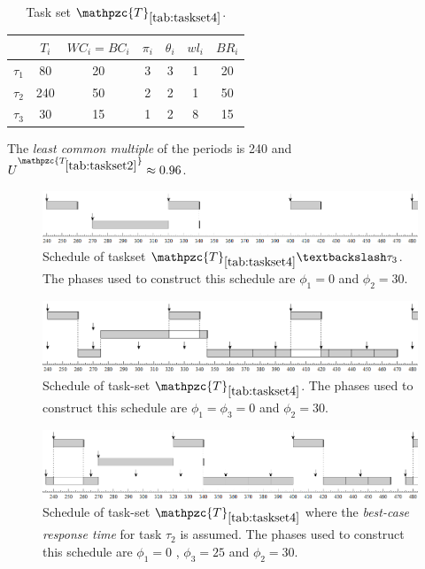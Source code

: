 \documentclass[fleqn]{article}
\begin{document}
\begin{table}[H]
	\center
	\caption{Task set $\mathpzc{T}_{\ref{tab:taskset4}}$.}
	\label{tab:taskset4}
	\begin{tabular}{c c c c c | c c}
		\hline 
		& $T_i$ & $WC_i=BC_i$ & $\pi_i$ & $\theta_i$ &  $wl_i$ & $BR_i$\\ 
		\hline 
		$\tau_1$& 80  & 20  & 3 & 3 &  1 & 20\\
		$\tau_2$& 240 & 50  & 2 & 2 &  1 & 50\\ 
		$\tau_3$& 30  & 15  & 1 & 2 &  8 & 15\\ 
		\hline 
	\end{tabular}
	\small
	\item The \textit{least common multiple} of the periods is 240 and $U^{\mathpzc{T_{\ref{tab:taskset2}}}} \approx 0.96$.
\end{table} 

\begin{figure}[H]
	\centering
	\includegraphics[width=0.9\linewidth]{figures/fact6_1}
	\caption{Schedule of taskset $\mathpzc{T}_{\ref{tab:taskset4}} \textbackslash \tau_3$. The phases used to construct this schedule are $\phi_1 = 0$ and $\phi_2 = 30$.}
	\label{fig:fact7_1}
\end{figure}

\begin{figure}[H]
	\centering
	\includegraphics[width=0.9\linewidth]{figures/fact7_2}
	\caption{Schedule of task-set $\mathpzc{T}_{\ref{tab:taskset4}}$. The phases used to construct this schedule are $\phi_1 = \phi_3 = 0$ and $\phi_2 = 30$.}
	\label{fig:fact7_2}
\end{figure}

\begin{figure}[H]
	\centering
	\includegraphics[width=0.9\linewidth]{figures/fact7_3}
	\caption{Schedule of task-set $\mathpzc{T}_{\ref{tab:taskset4}}$ where the \textit{best-case response time} for task $\tau_2$ is assumed. The phases used to construct this schedule are $\phi_1 = 0$ , $\phi_3 = 25$ and $\phi_2 = 30$.}
	\label{fig:fact7_3}
\end{figure}
\end{document}

